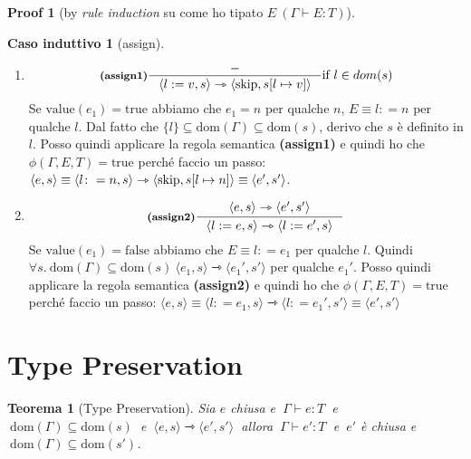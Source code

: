 \documentclass[a4paper, 10pt]{article}
\newcommand{\skipp}{\textup{skip}}
\newtheorem{thm}{Teorema}[]
\theoremstyle{definition}
\newtheorem{prf}{Proof}[]
\newtheorem{ind}{Caso induttivo}
\newcommand{\infer}[4]{\inference[\textbf{#1}]{#2}{#3}#4 }
\newcommand{\srule}[2]{\langle #1 \rangle \rightarrowtriangle \langle #2 \rangle}
\newcommand{\memrep}[3]{#1 \lbrack #2 \mapsto #3 \rbrack}
\begin{document}
\begin{multicols}{2}
\begin{prf}[by \textit{rule induction} su come ho tipato $ E\ (\Gamma \vdash E\colon T) $]
\begin{ind}[assign]
		\begin{enumerate}
			\item
			\[
				\infer{(assign1)}{-}{\srule{l:=v,s}{\text{skip}, \memrep{s}{l}{v}}}{\text{if } l \in dom(s)} 
			\]
			Se $ \text{value}(e_1) = \text{true} $ abbiamo che $ e_1 = n $ per qualche $ n $, $ E\equiv l\colon = n $ per qualche $ l $. Dal fatto che $ \{l\} \subseteq \text{dom}(\Gamma)\subseteq \text{dom}(s) $, derivo che $ s $ è definito in $ l $. Posso quindi applicare la regola semantica \textbf{(assign1)} e quindi ho che $ \phi(\Gamma, E, T) =\text{true} $ perché faccio un passo: 
			$ \langle e, s \rangle \equiv \srule{l\colon = n, s}{\skipp, s[l\mapsto n]}\equiv \langle e', s' \rangle $.
			\item
			\[
				\infer{(assign2)}{\srule{e,s}{e',s'}}{\srule{l:=e,s}{l:=e',s}}{}
			\]
			Se $ \text{value}(e_1) = \text{false} $ abbiamo che $ E\equiv l\colon = e_1 $ per qualche $ l $. Quindi $ \forall s.\ \text{dom}(\Gamma)\subseteq \text{dom}(s)\ \srule{e_1, s}{e_1', s'} $ per qualche $ e_1' $. Posso quindi applicare la regola semantica \textbf{(assign2)} e quindi ho che $ \phi(\Gamma, E, T) =\text{true} $ perché faccio un passo:
			$ \langle e, s \rangle \equiv \srule{l\colon= e_1, s}{l\colon= e_1', s'} \equiv \langle e', s' \rangle$
		\end{enumerate} 
	\end{ind}
\end{prf}
	
\end{multicols}

\newpage
\setcounter{thm}{0}
\setcounter{prf}{0}
\setcounter{base}{0}
\setcounter{ind}{0}
\section*{Type Preservation}
\begin{thm}[Type Preservation]
	Sia $ e $ chiusa e $\ \Gamma \vdash e\colon T\ $ e $\ \text{dom}(\Gamma) \subseteq \text{dom}(s)\ $ e $\ \srule{e, s}{e', s'} \ $ allora $\ \Gamma \vdash e'\colon T\ $ e $\ e' $ è chiusa e $\ \text{dom}(\Gamma) \subseteq \text{dom}(s') $.
\end{thm}
\end{document}
